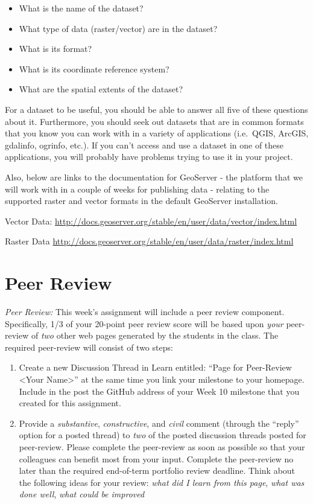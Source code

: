 \documentclass[]{book}
\begin{document}
\begin{itemize}
\item
  What is the name of the dataset?
\item
  What type of data (raster/vector) are in the dataset?
\item
  What is its format?
\item
  What is its coordinate reference system?
\item
  What are the spatial extents of the dataset?
\end{itemize}

For a dataset to be useful, you should be able to answer all five of
these questions about it. Furthermore, you should seek out datasets that
are in common formats that you know you can work with in a variety of
applications (i.e.~QGIS, ArcGIS, gdalinfo, ogrinfo, etc.). If you can't
access and use a dataset in one of these applications, you will probably
have problems trying to use it in your project.

Also, below are links to the documentation for GeoServer - the platform
that we will work with in a couple of weeks for publishing data -
relating to the supported raster and vector formats in the default
GeoServer installation.

Vector Data:
\url{http://docs.geoserver.org/stable/en/user/data/vector/index.html}

Raster Data
\url{http://docs.geoserver.org/stable/en/user/data/raster/index.html}

\section{Peer Review}\label{peer-review-1}

\emph{Peer Review:} This week's assignment will include a peer review
component. Specifically, 1/3 of your 20-point peer review score will be
based upon \emph{your} peer-review of \emph{two} other web pages
generated by the students in the class. The required peer-review will
consist of two steps:

\begin{enumerate}
\def\labelenumi{\arabic{enumi}.}
\item
  Create a new Discussion Thread in Learn entitled: ``Page for
  Peer-Review \textless{}Your Name\textgreater{}'' at the same time you
  link your milestone to your homepage. Include in the post the GitHub
  address of your Week 10 milestone that you created for this
  assignment.
\item
  Provide a \emph{substantive}, \emph{constructive}, and \emph{civil}
  comment (through the ``reply'' option for a posted thread) to
  \emph{two} of the posted discussion threads posted for peer-review.
  Please complete the peer-review as soon as possible so that your
  colleagues can benefit most from your input. Complete the peer-review
  no later than the required end-of-term portfolio review deadline.
  Think about the following ideas for your review: \emph{what did I
  learn from this page}, \emph{what was done well}, \emph{what could be
  improved}
\end{enumerate}
\end{document}
